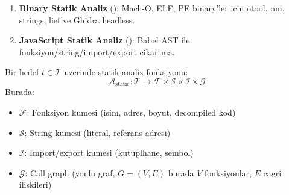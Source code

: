 \begin{enumerate}
\item \textbf{Binary Statik Analiz} (): Mach-O, ELF, PE binary'ler icin otool, nm, strings, lief ve Ghidra headless.
\item \textbf{JavaScript Statik Analiz} (): Babel AST ile fonksiyon/string/import/export cikartma.
\end{enumerate}

\begin{tanim}
Bir hedef $t \in \mathcal{T}$ uzerinde statik analiz fonksiyonu:
\begin{equation}
\label{eq:static-analysis}
\mathcal{A}_{\text{static}}: \mathcal{T} \longrightarrow \mathcal{F} \times \mathcal{S} \times \mathcal{I} \times \mathcal{G}
\end{equation}
Burada:
\begin{itemize}
\item $\mathcal{F}$: Fonksiyon kumesi (isim, adres, boyut, decompiled kod)
\item $\mathcal{S}$: String kumesi (literal, referans adresi)
\item $\mathcal{I}$: Import/export kumesi (kutuplhane, sembol)
\item $\mathcal{G}$: Call graph (yonlu graf, $G = (V, E)$ burada $V$ fonksiyonlar, $E$ cagri iliskileri)
\end{itemize}
\end{tanim}

